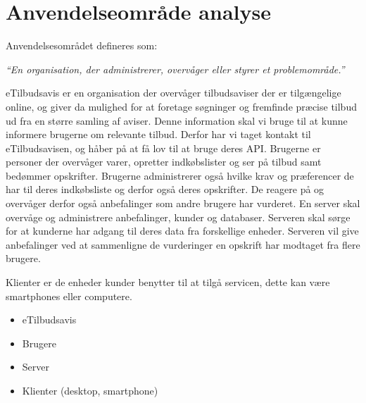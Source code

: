 \section{Anvendelseområde analyse}
Anvendelsesområdet defineres som:

\textit{``En organisation, der administrerer, overvåger eller styrer et problemområde.''}

eTilbudsavis er en organisation der overvåger tilbudsaviser der er tilgængelige online, og giver da mulighed for at foretage søgninger og fremfinde præcise tilbud ud fra en større samling af aviser.
Denne information skal vi bruge til at kunne informere brugerne om relevante tilbud.
Derfor har vi taget kontakt til eTilbudsavisen, og håber på at få lov til at bruge deres API.
Brugerne er personer der overvåger varer, opretter indkøbslister og ser på tilbud samt bedømmer opskrifter.
Brugerne administrerer også hvilke krav og præferencer de har til deres indkøbsliste og derfor også deres opskrifter.
De reagere på og overvåger derfor også anbefalinger som andre brugere har vurderet.
En server skal overvåge og administrere anbefalinger, kunder og databaser.
Serveren skal sørge  for at kunderne har adgang til deres data fra forskellige enheder.
Serveren vil give anbefalinger ved at sammenligne de vurderinger en opskrift har modtaget fra flere brugere.

Klienter er de enheder kunder benytter til at tilgå servicen, dette kan være smartphones eller computere.

\begin{itemize}
	\item eTilbudsavis
	\item Brugere
	\item Server
	\item Klienter (desktop, smartphone)
\end{itemize}
